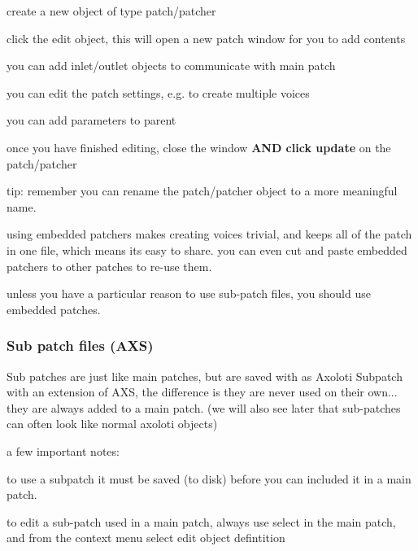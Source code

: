 \begin{DoxyItemize}
\item create a new object of type \textquotesingle{}patch/patcher\textquotesingle{} 
\item click the edit object, this will open a new patch window for you to add contents 
\item you can add inlet/outlet objects to communicate with main patch 
\item you can edit the patch settings, e.\+g. to create multiple voices 
\item you can add parameters to parent 
\item once you have finished editing, close the window {\bfseries A\+ND click update} on the patch/patcher 
\end{DoxyItemize}

tip\+: remember you can rename the patch/patcher object to a more meaningful name.

using embedded patchers makes creating voices trivial, and keeps all of the patch in one file, which means its easy to share. you can even cut and paste embedded patchers to other patches to re-\/use them.

unless you have a particular reason to use sub-\/patch files, you should use embedded patches.\hypertarget{axo_gui_axo_gui_axoloti_edit_mode_patch_subpatch_files}{}\subsubsection{Sub patch files (\+A\+X\+S)}\label{axo_gui_axo_gui_axoloti_edit_mode_patch_subpatch_files}
Sub patches are just like main patches, but are saved with as \textquotesingle{}Axoloti Subpatch\textquotesingle{} with an extension of A\+XS, the difference is they are never used on their own... they are always added to a main patch. (we will also see later that sub-\/patches can often look like normal axoloti objects)

a few important notes\+:


\begin{DoxyItemize}
\item to use a subpatch it must be saved (to disk) before you can included it in a main patch. 
\item to edit a sub-\/patch used in a main patch, always use select in the main patch, and from the context menu select \textquotesingle{}edit object defintition\textquotesingle{} 
\end{DoxyItemize}

